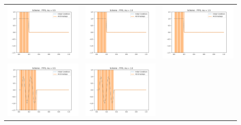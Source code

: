 \documentclass[a4paper,twoside,11pt]{article}
\begin{document}
\begin{table}[h]
    \centering
    \begin{tabular}{ | c | m{5cm} | m{5cm} | }
      \hline
      \begin{minipage}{.3\textwidth}
        \includegraphics[width=\linewidth, height=2.75cm]{../plots/scheme1-IC1-mu0_5.png}
      \end{minipage}
      &
      \begin{minipage}{.3\textwidth}
        \includegraphics[width=\linewidth, height=2.75cm]{../plots/scheme1-IC1-mu1_0.png}
      \end{minipage}
      &
      \begin{minipage}{.3\textwidth}
        \includegraphics[width=\linewidth, height=2.75cm]{../plots/scheme1-IC1-mu1_5.png}
      \end{minipage} \\
      \begin{minipage}{.3\textwidth}
        \includegraphics[width=\linewidth, height=2.75cm]{../plots/scheme1-IC2-mu0_5.png}
      \end{minipage}
      &
      \begin{minipage}{.3\textwidth}
        \includegraphics[width=\linewidth, height=2.75cm]{../plots/scheme1-IC2-mu1_0.png}

\end{minipage}
\end{tabular}
\end{table}
\end{document}
